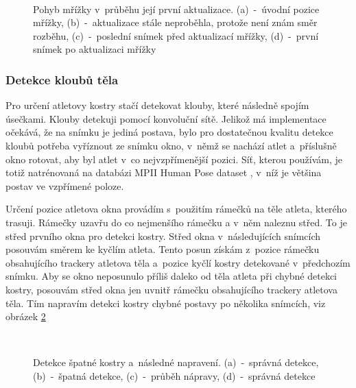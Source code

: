 \begin{figure}[p]\centering
     \\
    \caption{
        \centering\small
        Pohyb mřížky v~průběhu její první aktualizace. (a)~-~úvodní pozice mřížky, (b)~-~aktualizace stále neproběhla, protože není znám směr rozběhu, (c)~-~poslední snímek před aktualizací mřížky, (d)~-~první snímek po aktualizaci mřížky
    }
    \label{fig:mrizka}
\end{figure}



\subsubsection{Detekce kloubů těla}

Pro určení atletovy kostry stačí detekovat klouby, které následně spojím úsečkami. Klouby detekuji pomocí konvoluční sítě. Jelikož má implementace očekává, že na snímku je jediná postava, bylo pro dostatečnou kvalitu detekce kloubů potřeba vyříznout ze snímku okno, v~němž se nachází atlet a~příslušně okno rotovat, aby byl atlet v~co nejvzpřímenější pozici. Síť, kterou používám, je totiž natrénovaná na databázi MPII Human Pose dataset \citep{MPIIHPE}, v~níž je většina postav ve vzpřímené poloze.

Určení pozice atletova okna provádím s~použitím rámečků na těle atleta, kterého trasuji. Rámečky uzavřu do co nejmenšího rámečku a v~něm naleznu střed. To je střed prvního okna pro detekci kostry. Střed okna v~následujících snímcích posouvám směrem ke kyčlím atleta. Tento posun získám z~pozice rámečku obsahujícího trackery atletova těla a~pozice kyčlí kostry detekované v~předchozím snímku. Aby se okno neposunulo příliš daleko od těla atleta při chybné detekci kostry, posouvám střed okna jen uvnitř rámečku obsahujícího trackery atletova těla. Tím napravím detekci kostry chybné postavy po několika snímcích, viz obrázek \ref{fig:spatnakostra}

\begin{figure}[p]\centering
     \\
    \caption{
        \centering\small
        Detekce špatné kostry a~následné napravení. (a)~-~správná detekce, (b)~-~špatná detekce, (c)~-~průběh nápravy, (d)~-~správná detekce
    }
    \label{fig:spatnakostra}
\end{figure}

